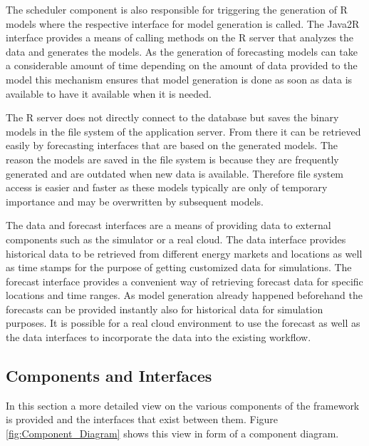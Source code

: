 The scheduler component is also responsible for triggering the generation of R models where the respective interface for model generation is called. The Java2R interface provides a means of calling methods on the R server that analyzes the data and generates the models. As the generation of forecasting models can take a considerable amount of time depending on the amount of data provided to the model this mechanism ensures that model generation is done as soon as data is available to have it available when it is needed. 

The R server does not directly connect to the database but saves the binary models in the file system of the application server. From there it can be retrieved easily by forecasting interfaces that are based on the generated models. The reason the models are saved in the file system is because they are frequently generated and are outdated when new data is available. Therefore file system access is easier and faster as these models typically are only of temporary importance and may be overwritten by subsequent models. 

The data and forecast interfaces are a means of providing data to external components such as the simulator or a real cloud. The data interface provides historical data to be retrieved from different energy markets and locations as well as time stamps for the purpose of getting customized data for simulations. The forecast interface provides a convenient way of retrieving forecast data for specific locations and time ranges. As model generation already happened beforehand the forecasts can be provided instantly also for historical data for simulation purposes. It is possible for a real cloud environment to use the forecast as well as the data interfaces to incorporate the data into the existing workflow. 


\subsection{Components and Interfaces}

In this section a more detailed view on the various components of the framework is provided and the interfaces that exist between them. Figure \ref{fig:Component_Diagram} shows this view in form of a component diagram. 

